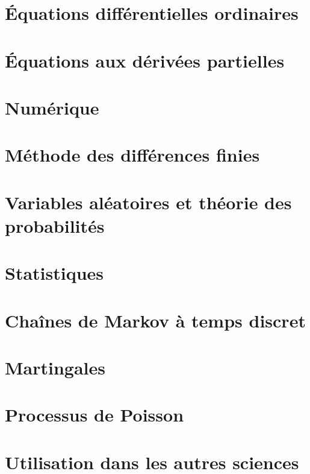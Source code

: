 \documentclass[a4paper,twoside,11pt]{book}
\begin{document}
\chapter{Équations différentielles ordinaires}





\chapter{Équations aux dérivées partielles}


\chapter{Numérique}





\chapter{Méthode des différences finies}


\chapter{Variables aléatoires et théorie des probabilités}




\chapter{Statistiques}


\chapter{Chaînes de Markov à temps discret}


\chapter{Martingales}


\chapter{Processus de Poisson}


\chapter{Utilisation dans les autres sciences}


\end{document}
